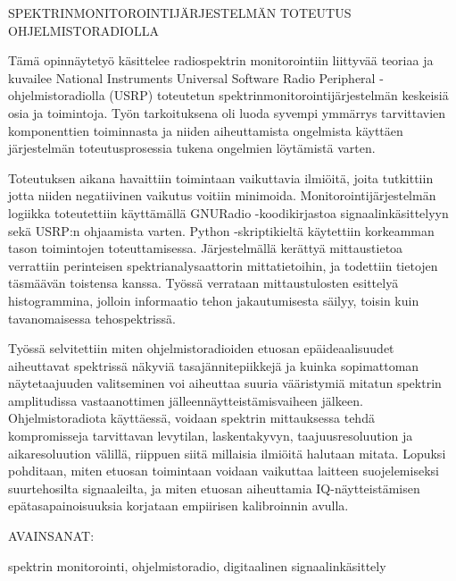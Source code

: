 \vspace{7mm}
{\huge SPEKTRINMONITOROINTIJÄRJESTELMÄN TOTEUTUS OHJELMISTORADIOLLA \par}

\vspace{7mm}


Tämä opinnäytetyö käsittelee radiospektrin monitorointiin liittyvää teoriaa ja kuvailee National Instruments Universal Software Radio Peripheral -ohjelmistoradiolla (USRP) toteutetun spektrinmonitorointijärjestelmän keskeisiä osia ja toimintoja.
Työn tarkoituksena oli luoda syvempi ymmärrys tarvittavien komponenttien toiminnasta ja niiden aiheuttamista ongelmista käyttäen järjestelmän toteutusprosessia tukena ongelmien löytämistä varten.

Toteutuksen aikana havaittiin toimintaan vaikuttavia ilmiöitä, joita tutkittiin jotta niiden negatiivinen vaikutus voitiin minimoida.
Monitorointijärjestelmän logiikka toteutettiin käyttämällä GNURadio -koodikirjastoa signaalinkäsittelyyn sekä USRP:n ohjaamista varten.
Python -skriptikieltä käytettiin korkeamman tason toimintojen toteuttamisessa.
Järjestelmällä kerättyä mittaustietoa verrattiin perinteisen spektrianalysaattorin mittatietoihin, ja todettiin tietojen täsmäävän toistensa kanssa.
Työssä verrataan mittaustulosten esittelyä histogrammina, jolloin informaatio tehon jakautumisesta säilyy, toisin kuin tavanomaisessa tehospektrissä.

Työssä selvitettiin miten ohjelmistoradioiden etuosan epäideaalisuudet aiheuttavat spektrissä näkyviä tasajännitepiikkejä ja kuinka sopimattoman näytetaajuuden valitseminen voi aiheuttaa suuria vääristymiä mitatun spektrin amplitudissa vastaanottimen jälleennäytteistämisvaiheen jälkeen.
Ohjelmistoradiota käyttäessä, voidaan spektrin mittauksessa tehdä kompromisseja tarvittavan levytilan, laskentakyvyn, taajuusresoluution ja aikaresoluution välillä, riippuen siitä millaisia ilmiöitä halutaan mitata.
Lopuksi pohditaan, miten etuosan toimintaan voidaan vaikuttaa laitteen suojelemiseksi suurtehosilta signaaleilta, ja miten etuosan aiheuttamia IQ-näytteistämisen epätasapainoisuuksia korjataan empiirisen kalibroinnin avulla.




\vspace{10mm}

AVAINSANAT:

spektrin monitorointi, ohjelmistoradio, digitaalinen signaalinkäsittely
